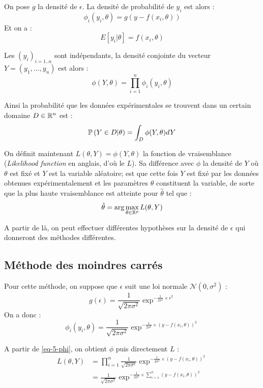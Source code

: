 		On pose $g$ la densité de $\epsilon$.
		La densité de probabilité de $y_i$ est alors :
		$$
			\phi_i(y_i,\theta) = g(y - f(x_i, \theta))
		$$
		Et on a :
		$$
			E[y_i|\theta] = f(x_i,\theta)
		$$

		Les $(y_i)_{i=1..n}$ sont indépendants, la densité conjointe du vecteur $Y = (y_1, ..., y_n)$ est alors :
		\begin{equation}
			\label{eq-5-phi}
			\phi(Y, \theta) = \prod_{i=1}^n \phi_i(y_i,\theta)
		\end{equation}
		
		Ainsi la probabilité que les données expérimentales se trouvent dans un certain domaine $D\in\mathbb{R}^n$ est :
		$$
			\mathbb{P}\,(Y \in D | \theta) = \int_D \phi(Y, \theta) dY
		$$

		On définit maintenant $L(\theta,Y) = \phi(Y, \theta)$ la fonction de vraisemblance (\emph{Likelihood function} en anglais, d'où le $L$). Sa différence avec $\phi$ la densité de $Y$ où $\theta$ est fixé et $Y$ est la variable aléatoire; est que cette fois $Y$ est fixé par les données obtenues expérimentalement et les paramètres $\theta$ constituent la variable, de sorte que la plus haute vraisemblance est atteinte pour $\hat\theta$ tel que :
		$$
			\hat\theta = \arg \max_{\theta \in \mathbb{R}^p} L(\theta,Y)
		$$

		A partir de là, on peut effectuer différentes hypothèses sur la densité de $\epsilon$ qui donneront des méthodes différentes.


	\subsection{Méthode des moindres carrés}

		Pour cette méthode, on suppose que $\epsilon$ suit une loi normale $\mathcal{N}(0, \sigma^2)$ :
		\begin{equation}
			\label{eq-5-errorLSM}
			g(\epsilon) = \frac{1}{\sqrt{2\pi\sigma^2}} \exp^{-\frac{1}{2\sigma^2} \times \epsilon^2} 
		\end{equation}
		On a donc :
		$$
			\phi_i(y_i,\theta) = \frac{1}{\sqrt{2\pi\sigma^2}} \exp^{-\frac{1}{2\sigma^2} \times \left( y - f(x_i, \theta)\right)^2} 
		$$

		A partir de \eqref{eq-5-phi}, on obtient $\phi$ puis directement $L$ :
		\begin{align*}
			L(\theta,Y) 	&= \prod_{i=1}^n \frac{1}{\sqrt{2\pi\sigma^2}} \exp^{-\frac{1}{2\sigma^2} \times \left( y - f(x_i, \theta)\right)^2}
			\\
			&= \frac{1}{\sqrt{2\pi\sigma^2}} \exp^{-\frac{1}{2\sigma^2} \times \sum_{i=1}^n \left( y - f(x_i, \theta)\right)^2}
		\end{align*}

